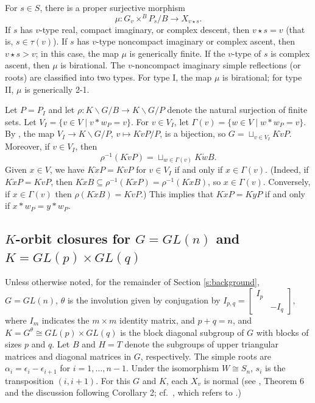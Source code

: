 \documentclass[11pt,letterpaper,reqno]{amsart}
\newcommand{\ga}{\alpha}
\newcommand{\gre}{\epsilon}
\numberwithin{equation}{section}
\theoremstyle{plain}
\theoremstyle{definition}
\theoremstyle{remark}
\begin{document}
For $s \in S$, there is a proper surjective morphism
\begin{equation} \label{e:morphism}
\mu: G_v \times^B P_s/B \to X_{v \star s}.
\end{equation}
If $s$ has $v$-type real, compact imaginary, or complex descent, then $v \star s = v$ (that is, $s \in \tau(v)$).  If $s$ has
$v$-type noncompact imaginary or complex ascent, then $v \star s > v$; in this case, the map $\mu$ is generically finite.
If the $v$-type of $s$ is complex ascent, then $\mu$ is birational.
The $v$-noncompact imaginary simple reflections (or roots) are classified into two types.  For type I, the map $\mu$ is birational;
for type II, $\mu$ is generically 2-1.

Let $P = P_I$ and let $\rho: K\backslash G/B \to K\backslash G/P$ denote the 
natural surjection of finite sets.  
Let $V_I = \{ v \in V \mid v * w_P = v \}$.  For $v \in V_I$, let 
$\Gamma(v) = \{ w \in V \mid w * w_P = v \}$.
By \cite[Section 3.4]{RS93},
the map $V_I \to K \backslash G/P$, $v \mapsto K\dot{v}P/P$, is a bijection, so
$G = \sqcup_{v \in V_I} K \dot{v} P$.  Moreover, if $v \in V_I$, then
$$
\rho^{-1}(K \dot{v} P) = \sqcup_{w \in \Gamma(v)} K \dot{w} B.
$$
Given $x \in V$, we have $K \dot{x} P = K \dot{v} P$ for $v \in V_I$ if and only if $x \in \Gamma(v)$.
(Indeed, if $K \dot{x} P = K \dot{v} P$, then $K \dot{x} B \subseteq \rho^{-1}(K \dot{x} P) = \rho^{-1}(K \dot{x} B)$, so $x \in \Gamma(v)$.
Conversely, if $x \in \Gamma(v)$ then $\rho(K \dot{x} B) =  K \dot{v} P$.)  
This implies that $K \dot{x} P = K \dot{y} P$ if and only if $x * w_P = y * w_P$.



\subsection{$K$-orbit closures for $G = GL(n)$ and $K = GL(p) \times GL(q)$} \label{ss:K-orbit-particular}
Unless otherwise noted, for the remainder of Section \ref{s:background}, $G = GL(n)$, $\theta$ is the involution
given by conjugation by 
$
I_{p,q}=
\begin{bmatrix}
I_p & \\
 & -I_q
\end{bmatrix},
$
where $I_m$ indicates the $m\times m$ identity matrix, and $p+q = n$,
and $K = G^{\theta} \cong GL(p) \times GL(q)$
is the block diagonal subgroup of $G$ with blocks of sizes $p$ and $q$.  Let $B$ and $H = T$ denote the subgroups of upper triangular matrices and diagonal matrices in $G$, respectively.  
The simple roots are $\ga_i = \gre_i -  \gre_{i+1} $ for $i = 1, \ldots, n-1$.  Under the isomorphism $W \cong S_n$, 
$s_i$ is the transposition $(i, i+1)$.  For this $G$ and $K$, each $X_v$ is normal (see \cite{Brion2001}, Theorem 6 and the discussion following Corollary 2;
cf.~\cite{WWY}, which refers to \cite{Brion2001}.)  
\end{document}
